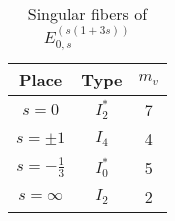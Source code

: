 \documentclass[main]{subfiles}
\begin{document}
\begin{table}[h]
    \centering
    \caption{Singular fibers of $E_{0,s}^{(s(1 + 3s))}$}
    \begin{tabular}{|c|c|c|}
        \hline
        Place            & Type    & $m_v$ \\
        \hline
        $s=0$            & $I_2^*$ & 7     \\
        $s=\pm 1$        & $I_4$   & 4     \\
        $s=-\frac{1}{3}$ & $I_0^*$ & 5     \\
        $s=\infty$       & $I_2$   & 2     \\
        \hline
    \end{tabular}
\end{table}
\end{document}
